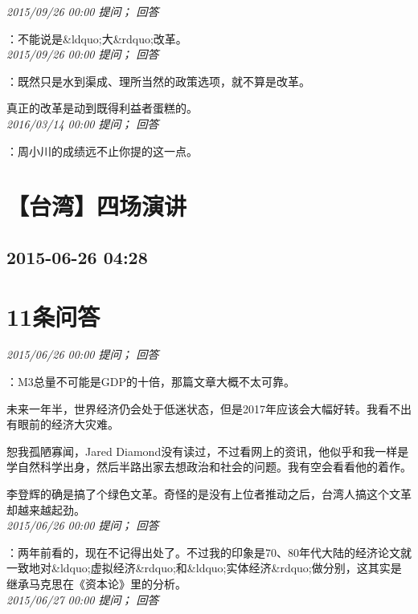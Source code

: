 \documentclass[twocolumn]{ctexart}
\begin{document}
\textit{\hfill\noindent\small 2015/09/26 00:00 提问； 回答}

：不能说是\&ldquo;大\&rdquo;改革。\\

\textit{\hfill\noindent\small 2015/09/26 00:00 提问； 回答}

：既然只是水到渠成、理所当然的政策选项，就不算是改革。

真正的改革是动到既得利益者蛋糕的。\\

\textit{\hfill\noindent\small 2016/03/14 00:00 提问； 回答}

：周小川的成绩远不止你提的这一点。\\


\section{【台湾】四场演讲}
\subsection{2015-06-26 04:28}


\section{11条问答}

\textit{\hfill\noindent\small 2015/06/26 00:00 提问； 回答}

：M3总量不可能是GDP的十倍，那篇文章大概不太可靠。

未来一年半，世界经济仍会处于低迷状态，但是2017年应该会大幅好转。我看不出有眼前的经济大灾难。

恕我孤陋寡闻，Jared Diamond没有读过，不过看网上的资讯，他似乎和我一样是学自然科学出身，然后半路出家去想政治和社会的问题。我有空会看看他的着作。

李登辉的确是搞了个绿色文革。奇怪的是没有上位者推动之后，台湾人搞这个文革却越来越起劲。\\

\textit{\hfill\noindent\small 2015/06/26 00:00 提问； 回答}

：两年前看的，现在不记得出处了。不过我的印象是70、80年代大陆的经济论文就一致地对\&ldquo;虚拟经济\&rdquo;和\&ldquo;实体经济\&rdquo;做分别，这其实是继承马克思在《资本论》里的分析。\\

\textit{\hfill\noindent\small 2015/06/27 00:00 提问； 回答}
\end{document}
